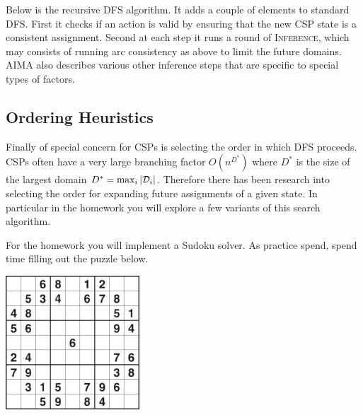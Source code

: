 \documentclass[11pt]{article}
\begin{document}
\censor{}

\air

Below is the recursive DFS algorithm. It adds a couple of elements to standard DFS. First it checks if an action is valid by ensuring that the
new CSP state is a consistent assignment. Second at  each  
step it runs a round of \textsc{Inference},  
which may consists of running arc consistency as above to limit the future domains. AIMA 
also describes various other inference steps that are specific to 
special types of factors.

\begin{algorithm}[h]
\begin{algorithmic}[1]
  \EndIf{}
   
  \EndIf{}
   

  \EndIf{}

  \EndIf{}
  \EndFor{}
  \EndProcedure{}
\end{algorithmic}
\end{algorithm}

\subsection{Ordering Heuristics}
  
Finally of special concern for CSPs is selecting the order in which DFS 
proceeds. CSPs often have a very large branching factor $O(n^{D^*})$ where 
$D^*$ is the size of the largest domain $D^* = \max_{i} |\mathcal{D}_i|$. Therefore 
there has been research into selecting the order for expanding future 
assignments of a given state. In particular in the homework you will explore a few variants of this search algorithm.

\begin{exercise}
  For the homework you will implement a Sudoku solver. As practice spend, spend time filling out the puzzle below.
\end{exercise}

\begin{center}
  \includegraphics[width=5cm]{pics/sudoku}
\end{center}
\end{document}
